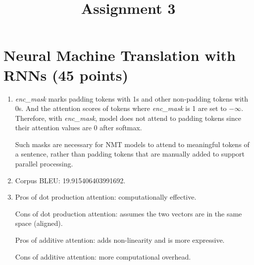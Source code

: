 \documentclass[11pt, a4paper, oneside]{article}
\title{\textbf{Assignment 3}}
\author{}
\date{\empty}
\begin{document}
\maketitle
\section{Neural Machine Translation with RNNs (45 points)}
\begin{enumerate}[label=(\alph*), left=0pt, labelsep=1em, itemsep=1em]
    \item[(g)] \textit{enc\_mask} marks padding tokens with 1s and other non-padding tokens 
    with 0s. And the attention scores of tokens where \textit{enc\_mask} is 1 are set 
    to $-\infty$. Therefore, with \textit{enc\_mask}, model does not attend to padding tokens 
    since their attention values are 0 after softmax.

    Such masks are necessary for NMT models to attend to meaningful tokens of a sentence, rather
    than padding tokens that are manually added to support parallel processing.
    \item[(h)] Corpus BLEU: 19.915406403991692.
    
    \item[(i)] 
    Pros of dot production attention: computationally effective.
    
    Cons of dot production attention: assumes the two vectors are in the same space (aligned).

    Pros of additive attention: adds non-linearity and is more expressive.

    Cons of additive attention: more computational overhead.
\end{enumerate}
\end{document}

